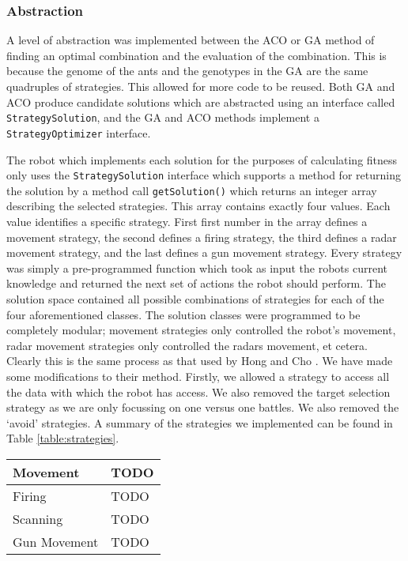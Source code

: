 

\subsubsection{Abstraction}
A level of abstraction was implemented between the ACO or GA method of finding an optimal combination and the evaluation of the combination. This is because the genome of the ants and the genotypes in the GA are the same quadruples of strategies. This allowed for more code to be reused. Both GA and ACO produce candidate solutions which are abstracted using an interface called \texttt{StrategySolution}, and the GA and ACO methods implement a \texttt{StrategyOptimizer} interface.

The robot which implements each solution for the purposes of calculating fitness only uses the \texttt{StrategySolution} interface which supports a method for returning the solution by a method call \texttt{getSolution()} which returns an integer array describing the selected strategies. This array contains exactly four values. Each value identifies a specific strategy. First first number in the array defines a movement strategy, the second defines a firing strategy, the third defines a radar movement strategy, and the last defines a gun movement strategy. Every strategy was simply a pre-programmed function which took as input the robots current knowledge and returned the next set of actions the robot should perform. The solution space contained all possible combinations of strategies for each of the four aforementioned classes. The solution classes were programmed to be completely modular; movement strategies only controlled the robot's movement, radar movement strategies only controlled the radars movement, et cetera. Clearly this is the same process as that used by Hong and Cho \cite{emergentbehaviours}. We have made some modifications to their method. Firstly, we allowed a strategy to access all the data with which the robot has access. We also removed the target selection strategy as we are only focussing on one versus one battles. We also removed the `avoid' strategies. A summary of the strategies we implemented can be found in Table \ref{table:strategies}.

\begin{table*}
\centering
\begin{tabular}{|l|l|}
\hline
Movement & TODO \\
\hline
Firing & TODO \\
\hline
Scanning & TODO \\
\hline
Gun Movement & TODO \\
\hline
\end{tabular}
\caption{A Summary of the Strategies Combined in to form the Solution-Space of the Ant Colony Optimization and Genetic Algorithms}
\label{table:strategies}
\end{table*}


